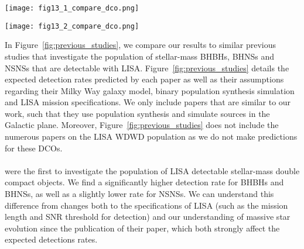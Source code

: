 \begin{figure*}[p]
    \centering
    \texttt{[image: fig13\_1\_compare\_dco.png]}

    \vspace{0.5cm}

    \texttt{[image: fig13\_2\_compare\_dco.png]}
    \caption{A table comparing previous studies of a similar nature to this work. The works listed in the table are \citet{Nelemans+2001}, \citet{Belczynski+2010}, \citet{Liu+2014}, \citet{Lamberts+2018}, \citet{Sesana+2020}, \citet{Lau+2020}, \citet{Breivik+2020} and \citet{Shao+2021}. \href{https://github.com/TomWagg/detecting-DCOs-in-LISA/blob/main/paper/figures/fig13_1_compare_dco.png}{\faFileImage} \href{https://github.com/TomWagg/detecting-DCOs-in-LISA/blob/main/paper/figures/fig13_2_compare_dco.png}{\faFileImage} \href{https://github.com/TomWagg/detecting-DCOs-in-LISA/blob/main/paper/previous_BH_NS_studies.xlsx}{\faFileExcel}.}
    \label{fig:previous_studies}
\end{figure*}

In Figure~\ref{fig:previous_studies}, we compare our results to similar previous studies that investigate the population of stellar-mass BHBHs, BHNSs and NSNSs that are detectable with LISA. Figure~\ref{fig:previous_studies} details the expected detection rates predicted by each paper as well as their assumptions regarding their Milky Way galaxy model, binary population synthesis simulation and LISA mission specifications. We only include papers that are similar to our work, such that they use population synthesis and simulate sources in the Galactic plane. Moreover, Figure~\ref{fig:previous_studies} does not include the numerous papers on the LISA WDWD population as we do not make predictions for these DCOs.
 
\paragraph{\citet{Nelemans+2001}} were the first to investigate the population of LISA detectable stellar-mass double compact objects. We find a significantly higher detection rate for BHBHs and BHNSs, as well as a slightly lower rate for NSNSs. We can understand this difference from changes both to the specifications of LISA (such as the mission length and SNR threshold for detection) and our understanding of massive star evolution since the publication of their paper, which both strongly affect the expected detections rates.

